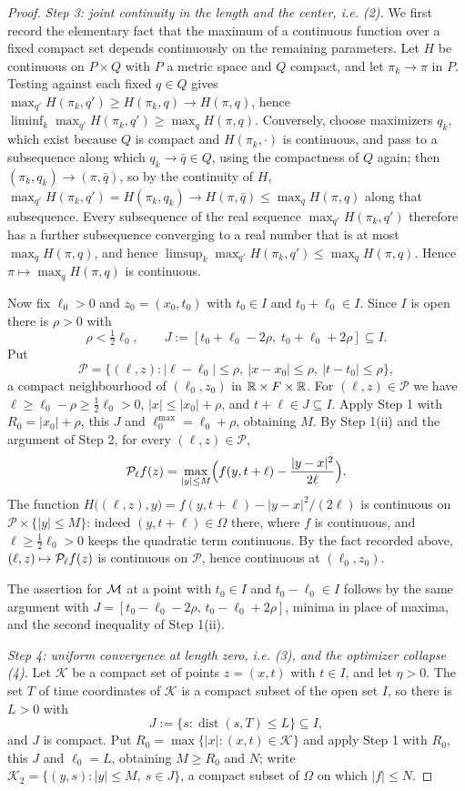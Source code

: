 \begin{proof}
\emph{Step 3: joint continuity in the length and the center, i.e. (2).}
We first record the elementary fact that the maximum of a continuous function
over a fixed compact set depends continuously on the remaining parameters. Let
$H$ be continuous on $P\times Q$ with $P$ a metric space and $Q$ compact, and
let $\pi_k\to\pi$ in $P$. Testing against each fixed $q\in Q$ gives
$\max_{q'}H(\pi_k,q')\ge H(\pi_k,q)\to H(\pi,q)$, hence
$\liminf_k\max_{q'}H(\pi_k,q')\ge\max_qH(\pi,q)$. Conversely, choose maximizers
$q_k$, which exist because $Q$ is compact and $H(\pi_k,\cdot)$ is continuous,
and pass to a subsequence along which $q_k\to\bar q\in Q$, using the compactness
of $Q$ again; then $(\pi_k,q_k)\to(\pi,\bar q)$, so by the continuity of $H$,
$\max_{q'}H(\pi_k,q')=H(\pi_k,q_k)\to H(\pi,\bar q)\le\max_qH(\pi,q)$ along that
subsequence. Every subsequence of the real sequence $\max_{q'}H(\pi_k,q')$
therefore has a further subsequence converging to a real number that is at most
$\max_qH(\pi,q)$, and hence
$\limsup_k\max_{q'}H(\pi_k,q')\le\max_qH(\pi,q)$. Hence
$\pi\mapsto\max_qH(\pi,q)$ is continuous.

Now fix $\ell_0>0$ and $z_0=(x_0,t_0)$ with $t_0\in I$ and $t_0+\ell_0\in I$.
Since $I$ is open there is $\rho>0$ with
\[
  \rho<\tfrac12\ell_0,\qquad
  J:=[t_0+\ell_0-2\rho,\;t_0+\ell_0+2\rho]\subseteq I .
\]
Put
\[
  \mathcal P=\bigl\{(\ell,z):|\ell-\ell_0|\le\rho,\ |x-x_0|\le\rho,\
      |t-t_0|\le\rho\bigr\},
\]
a compact neighbourhood of $(\ell_0,z_0)$ in $\mathbb{R}\times F\times\mathbb{R}$. For
$(\ell,z)\in\mathcal P$ we have $\ell\ge\ell_0-\rho\ge\tfrac12\ell_0>0$,
$|x|\le|x_0|+\rho$, and $t+\ell\in J\subseteq I$. Apply Step 1 with
$R_0=|x_0|+\rho$, this $J$ and $\ell_0^{\max}=\ell_0+\rho$, obtaining $M$. By
Step 1(ii) and the argument of Step 2, for every $(\ell,z)\in\mathcal P$,
\[
  \mathcal{P}_\ell f(z)=\max_{|y|\le M}
    \Bigl(f(y,t+\ell)-\frac{|y-x|^2}{2\ell}\Bigr).
\]
The function $H\bigl((\ell,z),y\bigr)=f(y,t+\ell)-|y-x|^2/(2\ell)$ is continuous
on $\mathcal P\times\{|y|\le M\}$: indeed $(y,t+\ell)\in\Omega$ there, where $f$
is continuous, and $\ell\ge\tfrac12\ell_0>0$ keeps the quadratic term
continuous. By the fact recorded above, $(\ell,z)\mapsto\mathcal{P}_\ell f(z)$ is
continuous on $\mathcal P$, hence continuous at $(\ell_0,z_0)$.

The assertion for $\mathcal{M}$ at a point with $t_0\in I$ and $t_0-\ell_0\in I$
follows by the same argument with
$J=[t_0-\ell_0-2\rho,\,t_0-\ell_0+2\rho]$, minima in place of maxima, and the
second inequality of Step 1(ii).

\emph{Step 4: uniform convergence at length zero, i.e. (3), and the optimizer
collapse (4).}
Let $\mathcal K$ be a compact set of points $z=(x,t)$ with $t\in I$, and let
$\eta>0$. The set $T$ of time coordinates of $\mathcal K$ is a compact subset of
the open set $I$, so there is $L>0$ with
\[
  J:=\{s:\operatorname{dist}(s,T)\le L\}\subseteq I ,
\]
and $J$ is compact. Put $R_0=\max\{|x|:(x,t)\in\mathcal K\}$ and apply Step 1
with $R_0$, this $J$ and $\ell_0=L$, obtaining $M\ge R_0$ and $N$; write
$\mathcal K_2=\{(y,s):|y|\le M,\ s\in J\}$, a compact subset of $\Omega$ on
which $|f|\le N$.


\end{proof}
